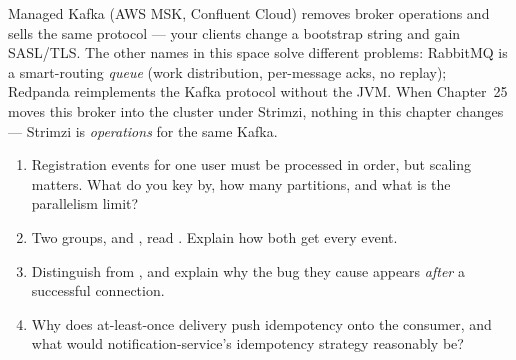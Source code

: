 Managed Kafka (AWS MSK, Confluent Cloud) removes broker operations and
sells the same protocol --- your clients change a bootstrap string and
gain SASL/TLS. The other names in this space solve different problems:
RabbitMQ is a smart-routing \emph{queue} (work distribution, per-message
acks, no replay); Redpanda reimplements the Kafka protocol without the
JVM. When Chapter~25 moves this broker into the cluster under Strimzi,
nothing in this chapter changes --- Strimzi is \emph{operations} for
the same Kafka.

\begin{quiz}
\begin{enumerate}
  \item Registration events for one user must be processed in order, but
  scaling matters. What do you key by, how many partitions, and what is
  the parallelism limit?
  \item Two groups,  and ,
  read . Explain how both get every event.
  \item Distinguish  from ,
  and explain why the bug they cause appears \emph{after} a successful
  connection.
  \item Why does at-least-once delivery push idempotency onto the
  consumer, and what would notification-service's idempotency strategy
  reasonably be?
\end{enumerate}
\end{quiz}
